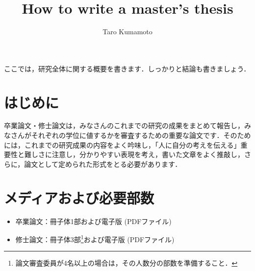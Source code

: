 \documentclass{kupaper}
\begin{document}


\title{How to write a master's thesis}
\author{Taro Kumamoto}


\Maketitle


\begin{Abstract}
	ここでは，研究全体に関する概要を書きます．しっかりと結論も書きましょう．
\end{Abstract}

\begin{abstract}
\end{abstract}

\setcounter{page}{1}
\tableofcontents

\chapter{はじめに}

卒業論文・修士論文は，みなさんのこれまでの研究の成果をまとめて報告し，みなさんがそれぞれの学位に値するかを審査するための重要な論文です．そのためには，これまでの研究成果の内容をよく吟味し，「人に自分の考えを伝える」重要性と難しさに注意し，分かりやすい表現を考え，書いた文章をよく推敲し，さらに，論文として定められた形式をとる必要があります．
\chapter{メディアおよび必要部数}
\begin{itemize}
	\item 卒業論文：冊子体1部および電子版 (PDFファイル) 
	\item 修士論文：冊子体3部\footnote{論文審査委員が4名以上の場合は，その人数分の部数を準備すること．}および電子版 (PDFファイル) 
\end{itemize}
\end{document}
